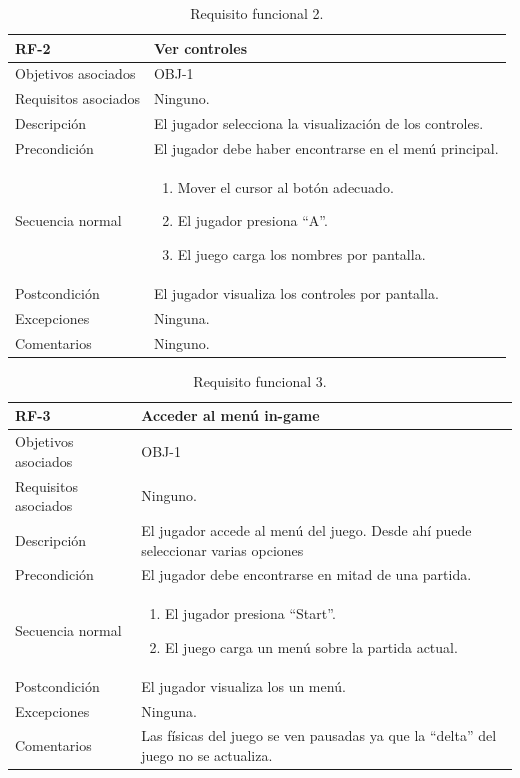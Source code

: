 \begin{table}[h]
	\centering
	\begin{tabular}{| l | p{11cm} |}
		\hline
		\textbf{RF-2} & \textbf{Ver controles} \\ \hline
		Objetivos asociados & OBJ-1 \\ \hline
		Requisitos asociados & Ninguno. \\ \hline
		Descripción & El jugador selecciona la visualización de los controles. \\ \hline
		Precondición & El jugador debe haber encontrarse en el menú principal.  \\ \hline
		Secuencia normal & 
		\begin{enumerate}
			\item Mover el cursor al botón adecuado.
			\item El jugador presiona ``A''.
			\item El juego carga los nombres por pantalla.
		\end{enumerate}
		\\ \hline
		Postcondición & El jugador visualiza los controles por pantalla. \\ \hline
		Excepciones & Ninguna. \\ \hline
		Comentarios & Ninguno. \\ \hline
	\end{tabular}
	\caption{Requisito funcional 2.}\label{tab:rf-2}
\end{table}

\begin{table}[h]
	\centering
	\begin{tabular}{| l | p{11cm} |}
		\hline
		\textbf{RF-3} & \textbf{Acceder al menú in-game} \\ \hline
		Objetivos asociados & OBJ-1 \\ \hline
		Requisitos asociados & Ninguno. \\ \hline
		Descripción & El jugador accede al menú del juego. Desde ahí puede seleccionar varias opciones \\ \hline
		Precondición & El jugador debe encontrarse en mitad de una partida.  \\ \hline
		Secuencia normal & 
		\begin{enumerate}
			\item El jugador presiona ``Start''.
			\item El juego carga un menú sobre la partida actual.
		\end{enumerate}
		\\ \hline
		Postcondición & El jugador visualiza los un menú. \\ \hline
		Excepciones & Ninguna. \\ \hline
		Comentarios & Las físicas del juego se ven pausadas ya que la ``delta'' del juego no se actualiza. \\ \hline
	\end{tabular}
	\caption{Requisito funcional 3.}\label{tab:rf-3}
\end{table}

